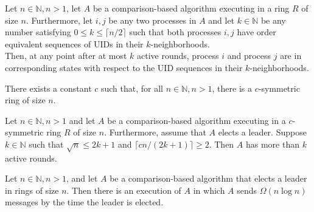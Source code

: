 \documentclass[a4paper]{article}
\begin{document}
\begin{samepage}
\begin{lemma}
Let $n \in \mathbb{N}, n > 1$, let $A$ be a comparison-based algorithm executing in a ring $R$ of size $n$. Furthermore, let $i, j$ be any two processes in $A$ and let $k \in \mathbb{N}$ be any number satisfying $0 \leq k \leq \lceil n/2 \rceil$ such that both processes $i, j$ have order equivalent sequences of UIDs in their $k$-neighborhoods. \\
Then, at any point after at most $k$ active rounds, process $i$ and process $j$ are in corresponding states with respect to the UID sequences in their $k$-neighborhoods.
\end{lemma}
\end{samepage}


\begin{theorem}
There exists a constant $c$ such that, for all $n \in \mathbb{N}, n > 1$, there is a $c$-symmetric ring of size $n$.
\end{theorem}


\begin{lemma}
Let $n \in \mathbb{N}, n > 1$ and let $A$ be a comparison-based algorithm executing in a $c$-symmetric ring $R$ of size $n$. Furthermore, assume that $A$ elects a leader. Suppose $k \in \mathbb{N}$ such that $\sqrt{n} \leq 2k + 1$ and $\lceil cn/(2k + 1) \rceil \geq 2$. Then $A$ has more than $k$ active rounds.
\end{lemma}


\begin{theorem}
Let $n \in \mathbb{N}, n > 1$, and let $A$ be a comparison-based algorithm that elects a leader in rings of size $n$. Then there is an execution of $A$ in which $A$ sends $\Omega(n \log{n})$ messages by the time the leader is elected.
\end{theorem}
\end{document}
